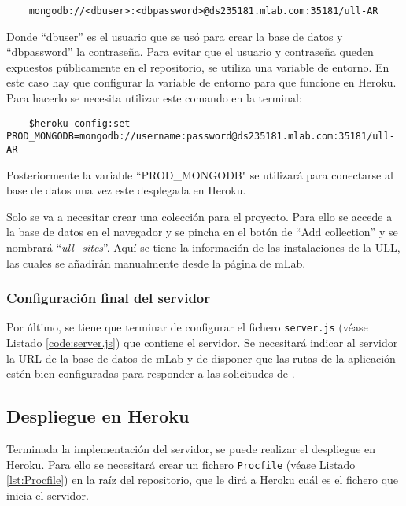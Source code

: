 \begin{lstlisting}
    mongodb://<dbuser>:<dbpassword>@ds235181.mlab.com:35181/ull-AR
\end{lstlisting}

Donde ``dbuser'' es el usuario que se usó para crear la base de datos y ``dbpassword'' la contraseña. Para evitar que el usuario y contraseña queden expuestos públicamente en el repositorio, se utiliza una variable de entorno. En este caso hay que configurar la variable de entorno para que funcione en Heroku. Para hacerlo se necesita utilizar este comando en la terminal:

\begin{lstlisting}
    $heroku config:set PROD_MONGODB=mongodb://username:password@ds235181.mlab.com:35181/ull-AR
\end{lstlisting}

Posteriormente la variable ``PROD\_MONGODB" se utilizará para conectarse al base de datos una vez este desplegada en Heroku.

Solo se va a necesitar crear una colección para el proyecto. Para ello se accede a la base de datos en el navegador y se pincha en el botón de ``Add collection'' y se nombrará ``\textit{ull\_sites}''. Aquí se tiene la información de las instalaciones de la ULL, las cuales se añadirán manualmente desde la página de mLab.


\subsubsection{Configuración final del servidor}

Por último, se tiene que terminar de configurar el fichero \texttt{server.js} (véase Listado \ref{code:server.js})  que contiene el servidor. Se necesitará indicar al servidor la URL de la base de datos de mLab y de disponer que las rutas de la aplicación estén bien configuradas para responder a las solicitudes de \ULLAR{}. 


\subsection{Despliegue en Heroku}

Terminada la implementación del servidor, se puede realizar el despliegue en Heroku. Para ello se necesitará crear un fichero \texttt{Procfile} (véase Listado \ref{lst:Procfile}) en la raíz del repositorio, que le dirá a Heroku cuál es el fichero que inicia el servidor.

